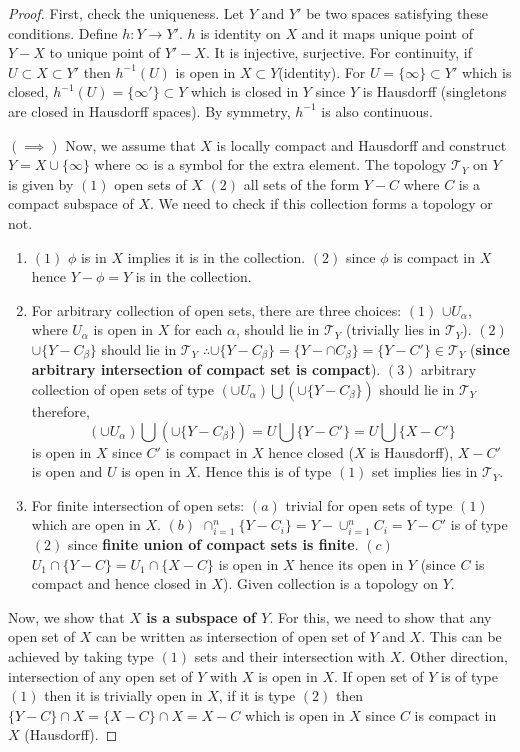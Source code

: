 \documentclass[12pt,reqno]{amsart}
\theoremstyle{plain}
\theoremstyle{definition}
\newcommand{\cal}[1]{\mathcal{#1}}
\begin{document}
\begin{proof}
    First, check the uniqueness. Let $Y$ and $Y'$ be two spaces satisfying these conditions. Define $h:Y \to Y'$. $h$ is identity on $X$ and it maps unique point of $Y-X$ to unique point of $Y'-X$. It is injective, surjective. For continuity, if $U \subset X \subset Y'$ then $h^{-1}(U)$ is open in $X \subset Y$(identity). For $U = \{\infty\} \subset Y'$ which is closed, $h^{-1}(U) = \{\infty'\} \subset Y$ which is closed in $Y$ since $Y$ is Hausdorff (singletons are closed in Hausdorff spaces). By symmetry, $h^{-1}$ is also continuous.

    \noindent$(\implies)$ Now, we assume that $X$ is locally compact and Hausdorff and construct $Y = X \cup \{\infty\}$ where $\infty$ is a symbol for the extra element. The topology $\cal T_Y$ on $Y$ is given by $(1)$ open sets of $X$ $(2)$ all sets of the form $Y - C$ where $C$ is a compact subspace of $X$. We need to check if this collection forms a topology or not. 
    \begin{enumerate}
        \item $(1)$ $\phi$ is in $X$ implies it is in the collection. $(2)$ since $\phi$ is compact in $X$ hence $Y - \phi = Y$ is in the collection. 
        \item  For arbitrary collection of open sets, there are three choices: $(1)$ $\cup U_\alpha$, where $U_\alpha$ is open in $X$ for each $\alpha$, should lie in $\cal T_Y$ (trivially lies in $\cal T_Y$). $(2)$ $\cup\{Y - C_\beta\}$ should lie in $\cal T_Y$ $\therefore \cup\{Y - C_\beta\} = \{Y - \cap C_\beta\} = \{Y - C'\} \in \cal T_Y$ ({\bf since arbitrary intersection of compact set is compact}).  $(3)$ arbitrary collection of open sets of type $(\cup U_\alpha) \bigcup (\cup \{Y - C_\beta\})$ should lie in $\cal T_Y$ therefore, 
        $$ (\cup U_\alpha) \bigcup (\cup \{Y - C_\beta\}) = U \bigcup \{Y - C'\} = U \bigcup \{X - C'\}$$ 
        is open in $X$ since $C'$ is compact in $X$ hence closed ($X$ is Hausdorff), $X - C'$ is open and $U$ is open in $X$. Hence this is of type $(1)$ set implies lies in $\cal T_Y$.
        \item For finite intersection of open sets: $(a)$ trivial for open sets of type $(1)$ which are open in $X$. $(b)$ $\cap_{i=1}^n \{Y - C_i\} = Y - \cup_{i=1}^n C_i = Y - C'$ is of type $(2)$ since {\bf finite union of compact sets is finite}. $(c)$ $U_1 \cap \{Y - C\} = U_1 \cap \{X - C\}$ is open in $X$ hence its open in $Y$ (since $C$ is compact and hence closed in $X$). Given collection is a topology on $Y$.
    \end{enumerate}
    Now, we show that {\bf $X$ is a subspace of $Y$}. For this, we need to show that any open set of $X$ can be written as intersection of open set of $Y$ and $X$. This can be achieved by taking type $(1)$ sets and their intersection with $X$. Other direction, intersection of any open set of $Y$ with $X$ is open in $X$. If open set of $Y$ is of type $(1)$ then it is trivially open in $X$, if it is type $(2)$ then $\{Y - C\} \cap X = \{X - C\} \cap X = X - C$ which is open in $X$ since $C$ is compact in $X$ (Hausdorff).


\end{proof}
\end{document}
